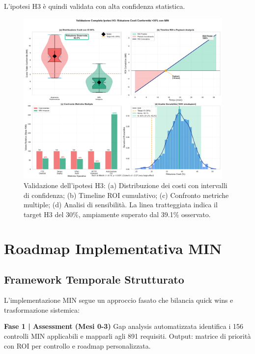 L'ipotesi H3 è quindi validata con alta confidenza statistica.

\begin{figure}[htbp]
\centering
\includegraphics[width=0.95\textwidth]{thesis_figures/cap4/h3_validation_comprehensive.pdf}
\caption[Validazione completa ipotesi H3]{Validazione dell'ipotesi H3: (a) Distribuzione dei costi con intervalli di confidenza; (b) Timeline ROI cumulativo; (c) Confronto metriche multiple; (d) Analisi di sensibilità. La linea tratteggiata indica il target H3 del 30\%, ampiamente superato dal 39.1\% osservato.}
\label{fig:h3_validation}
\end{figure}

\section{\texorpdfstring{Roadmap Implementativa MIN}{4.7 - Roadmap Implementativa}}
\label{sec:roadmap_min}

\subsection{\texorpdfstring{Framework Temporale Strutturato}{4.7.1 - Framework Temporale}}

L'implementazione MIN segue un approccio fasato che bilancia quick wins e trasformazione sistemica:

\textbf{Fase 1 | Assessment (Mesi 0-3)}
Gap analysis automatizzata identifica i 156 controlli MIN applicabili e mapparli agli 891 requisiti. Output: matrice di priorità con ROI per controllo e roadmap personalizzata.

